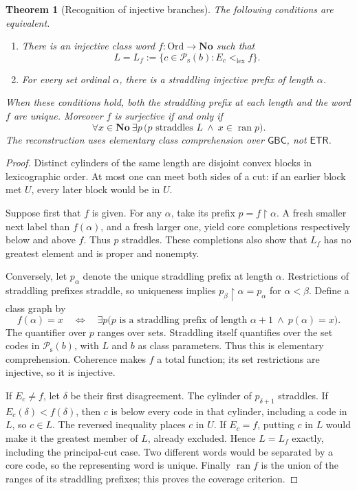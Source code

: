 \documentclass[11pt]{article}
\newtheorem{theorem}{Theorem}[section]
\theoremstyle{definition}
\theoremstyle{remark}
\newcommand{\No}{\mathbf{No}}
\newcommand{\Ord}{\mathrm{Ord}}
\newcommand{\Psupp}{\mathcal P_{\mathrm{s}}}
\newcommand{\lex}{\mathrm{lex}}
\newcommand{\ran}{\operatorname{ran}}
\newcommand{\res}{\mathbin{\upharpoonright}}
\newcommand{\GBC}{\mathsf{GBC}}
\newcommand{\ETR}{\mathsf{ETR}}
\begin{document}
\begin{theorem}[Recognition of injective branches]\label{swo:gs:thm:recognition}
The following conditions are equivalent.
\begin{enumerate}
\item There is an injective class word $f:\Ord\to\No$ such that
\[
 L=L_f:=\{c\in \Psupp(b):E_c<_{\lex} f\}.
\]
\item For every set ordinal $\alpha$, there is a straddling injective
prefix of length $\alpha$.
\end{enumerate}
When these conditions hold, both the straddling prefix at each length
and the word $f$ are unique. Moreover $f$ is surjective if and only if
\[\tag{S17.8}\label{swo:gs:eq:coverage}
 \forall x\in\No\ \exists p\,
 \bigl(p\text{ straddles }L\ \wedge\ x\in\ran p\bigr).
\]
The reconstruction uses elementary class comprehension over $\GBC$,
not $\ETR$.
\end{theorem}
\begin{proof}
Distinct cylinders of the same length are disjoint convex blocks in
lexicographic order. At most one can meet both sides of a cut: if an
earlier block met $U$, every later block would be in $U$.

Suppose first that $f$ is given. For any $\alpha$, take its prefix
$p=f\res\alpha$. A fresh smaller next label than $f(\alpha)$, and a
fresh larger one, yield core completions respectively below and above
$f$. Thus $p$ straddles. These completions also show that $L_f$ has no
greatest element and is proper and nonempty.

Conversely, let $p_\alpha$ denote the unique straddling prefix at length
$\alpha$. Restrictions of straddling prefixes straddle, so uniqueness
implies $p_\beta\res\alpha=p_\alpha$ for $\alpha<\beta$. Define a
class graph by
\[
 f(\alpha)=x\quad\Longleftrightarrow\quad
 \exists p\bigl(p\text{ is a straddling prefix of length }\alpha+1
                  \ \wedge\ p(\alpha)=x\bigr).
\]
The quantifier over $p$ ranges over sets. Straddling itself quantifies over
the set codes in $\Psupp(b)$, with $L$ and $b$ as class parameters. Thus this
is elementary comprehension. Coherence makes $f$ a total function; its
set restrictions are injective, so it is injective.

If $E_c\ne f$, let $\delta$ be their first disagreement. The cylinder
of $p_{\delta+1}$ straddles. If $E_c(\delta)<f(\delta)$, then $c$ is
below every code in that cylinder, including a code in $L$, so $c\in L$.
The reversed inequality places $c$ in $U$. If $E_c=f$, putting $c$ in
$L$ would make it the greatest member of $L$, already excluded. Hence
$L=L_f$ exactly, including the principal-cut case. Two different words
would be separated by a core code, so the representing word is unique.
Finally $\ran f$ is the union of the ranges of its straddling prefixes;
this proves the coverage criterion.
\end{proof}
\end{document}
